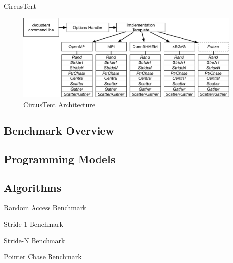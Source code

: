 
CircusTent

\begin{figure}[!t]
\centering
\includegraphics[width=5in]{figures/arch.pdf}
\caption{CircusTent Architecture}
\label{fig:ct_arch}
\end{figure}

\subsection{Benchmark Overview}
\label{subsec:benchmark_overview}

\subsection{Programming Models}
\label{subsec:programming_models}

\subsection{Algorithms}
\label{subsec:algorithms}

\begin{algorithm}
\SetAlgoLined
{}
\caption{Random Access Benchmark}
\label{alg:rand}
\end{algorithm}

\begin{algorithm}
\SetAlgoLined
{}
\caption{Stride-1 Benchmark}
\label{alg:s1}
\end{algorithm}

\begin{algorithm}
\SetAlgoLined
{}
\caption{Stride-N Benchmark}
\label{alg:sn}
\end{algorithm}

\begin{algorithm}
\SetAlgoLined
{}
\caption{Pointer Chase Benchmark}
\label{alg:ptrchase}
\end{algorithm}


